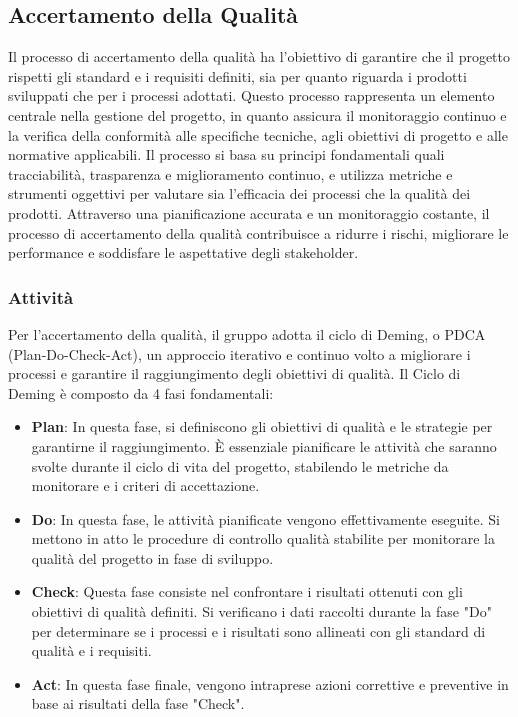 \subsection{Accertamento della Qualità}
\label{subsec:accertamento_qualità}
Il processo di accertamento della qualità ha l'obiettivo di garantire che il progetto rispetti gli standard e i requisiti definiti, sia per quanto riguarda i prodotti sviluppati che per i processi adottati. 
Questo processo rappresenta un elemento centrale nella gestione del progetto, in quanto assicura il monitoraggio continuo e la verifica della conformità alle specifiche tecniche, agli obiettivi di progetto e alle normative applicabili.
Il processo si basa su principi fondamentali quali tracciabilità, trasparenza e miglioramento continuo, e utilizza metriche e strumenti oggettivi 
per valutare sia l'efficacia dei processi che la qualità dei prodotti. 
Attraverso una pianificazione accurata e un monitoraggio costante, il processo di accertamento della qualità contribuisce a ridurre i rischi, migliorare le performance e soddisfare le aspettative degli stakeholder.
\subsubsection{Attività}
Per l'accertamento della qualità, il gruppo adotta il ciclo di Deming, o PDCA (Plan-Do-Check-Act), un approccio iterativo e continuo volto a migliorare i processi e garantire il raggiungimento degli obiettivi di qualità.
Il Ciclo di Deming è composto da 4 fasi fondamentali:
\begin{itemize}
    \item \textbf{Plan}: In questa fase, si definiscono gli obiettivi di qualità e le strategie per garantirne il raggiungimento.
    È essenziale pianificare le attività che saranno svolte durante il ciclo di vita del progetto, stabilendo le metriche da monitorare e i criteri di accettazione.
    \item \textbf{Do}: In questa fase, le attività pianificate vengono effettivamente eseguite.
    Si mettono in atto le procedure di controllo qualità stabilite per monitorare la qualità del progetto in fase di sviluppo.
    \item \textbf{Check}: Questa fase consiste nel confrontare i risultati ottenuti con gli obiettivi di qualità definiti.
    Si verificano i dati raccolti durante la fase "Do" per determinare se i processi e i risultati sono allineati con gli standard di qualità e i requisiti.
    \item \textbf{Act}: In questa fase finale, vengono intraprese azioni correttive e preventive in base ai risultati della fase "Check".
\end{itemize}
